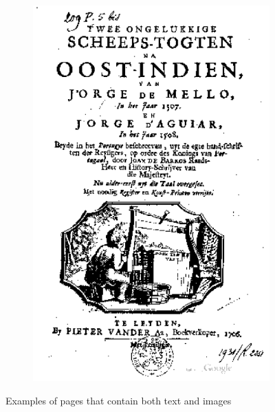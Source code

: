 \begin{figure}
\begin{subfigure}[b]{0.4\textwidth}
\includegraphics[width=\textwidth]{resources/pageImageExample2}
    \end{subfigure}
    \caption{Examples of pages that contain both text and images}
    \label{fig:textImageExamples}
\end{figure}


